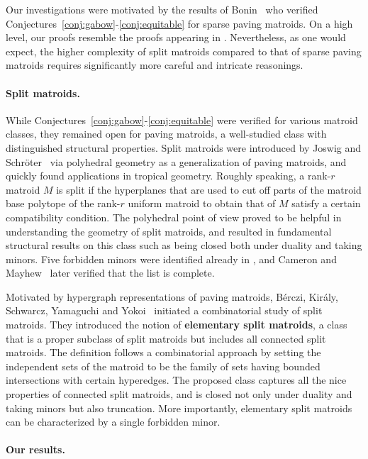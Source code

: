 \documentclass[11pt,a4paper]{article}
\theoremstyle{plain}
\theoremstyle{definition}
\begin{document}
Our investigations were motivated by the results of Bonin~\cite{bonin2013basis} who verified Conjectures~\ref{conj:gabow}-\ref{conj:equitable} for sparse paving matroids. On a high level, our proofs resemble the proofs appearing in \cite{bonin2013basis}. Nevertheless, as one would expect, the higher complexity of split matroids compared to that of sparse paving matroids requires significantly more careful and intricate reasonings. 

\paragraph{Split matroids.}

While Conjectures~\ref{conj:gabow}-\ref{conj:equitable} were verified for various matroid classes, 
they remained open for paving matroids, a well-studied class with distinguished structural properties. 
Split matroids were introduced by Joswig and Schr\"oter~\cite{joswig2017matroids} via polyhedral geometry as a generalization of paving matroids, and quickly found applications in tropical geometry. Roughly speaking, a rank-$r$ matroid $M$ is split if the hyperplanes that are used to cut off parts of the matroid base polytope of the rank-$r$ uniform matroid to obtain that of $M$ satisfy a certain compatibility condition. The polyhedral point of view proved to be helpful in understanding the geometry of split matroids, and resulted in fundamental structural results on this class such as being closed both under duality and taking minors. Five forbidden minors were identified already in \cite{joswig2017matroids}, and Cameron and Mayhew~\cite{cameron2021excluded} later verified that the list is complete. 

Motivated by hypergraph representations of paving matroids, B\'erczi, Kir\'aly, Schwarcz, Yamaguchi and Yokoi~\cite{berczi2022hypergraph} initiated a combinatorial study of split matroids. They introduced the notion of \textbf{elementary split matroids}, a class that is a proper subclass of split matroids but includes all connected split matroids. The definition follows a combinatorial approach by setting the independent sets of the matroid to be the family of sets having bounded intersections with certain hyperedges. The proposed class captures all the nice properties of connected split matroids, and is closed not only under duality and taking minors but also truncation. More importantly, elementary split matroids can be characterized by a single forbidden minor. 

\paragraph{Our results.}
\end{document}
